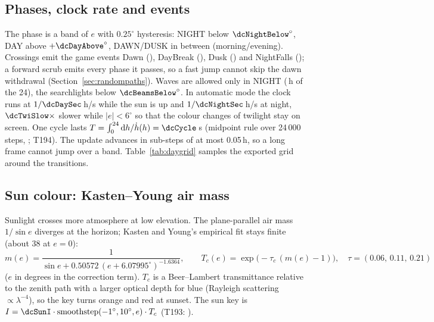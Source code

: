 \subsection{Phases, clock rate and events}
The phase is a band of $e$ with $0.25^\circ$ hysteresis: NIGHT below $\dcNightBelow^\circ$, DAY above $+\dcDayAbove^\circ$, DAWN/DUSK in between (morning/evening). Crossings emit the game events Dawn (\dcEvDawn), DayBreak (\dcEvDayBreak), Dusk (\dcEvDusk) and NightFalls (\dcEvNightFalls); a forward scrub emits every phase it passes, so a fast jump cannot skip the dawn withdrawal (Section~\ref{sec:randompaths}). Waves are allowed only in NIGHT (\dcWaveHours\,h of the 24), the searchlights below $\dcBeamsBelow^\circ$.
In automatic mode the clock runs at $1/\dcDaySec$\,h/s while the sun is up and $1/\dcNightSec$\,h/s at night, $\dcTwiSlow\times$ slower while $|e|<6^\circ$ so that the colour changes of twilight stay on screen. One cycle lasts $T=\int_0^{24}\mathrm d h/\dot h(h)=\dcCycle$\,s (midpoint rule over 24\,000 steps, ; T194). The update advances in sub-steps of at most 0.05\,h, so a long frame cannot jump over a band.
Table~\ref{tab:daygrid} samples the exported grid around the transitions.
\begin{table}[h]
\centering\scriptsize\setlength{\tabcolsep}{3pt}
\caption{Day-cycle grid (generated from ): elevation $e$, azimuth $A$, key light, its intensity and colour, exposure key $\log_2k$, daylight weight, practical-lamp scale, searchlights, waves and the mean cloud-shadow factor over the compound.}\label{tab:daygrid}
\tabDayGrid
\end{table}

\subsection{Sun colour: Kasten--Young air mass}
Sunlight crosses more atmosphere at low elevation. The plane-parallel air mass $1/\sin e$ diverges at the horizon; Kasten and Young's empirical fit stays finite (about 38 at $e=0$):
\begin{equation}
m(e)=\frac{1}{\sin e+0.50572\,(e+6.07995^\circ)^{-1.6364}},\qquad T_c(e)=\exp\bigl(-\tau_c\,(m(e)-1)\bigr),\quad \tau=(0.06,\,0.11,\,0.21)
\end{equation}
($e$ in degrees in the correction term). $T_c$ is a Beer--Lambert transmittance relative to the zenith path with a larger optical depth for blue (Rayleigh scattering $\propto\lambda^{-4}$), so the key turns orange and red at sunset. The sun key is $I=\dcSunI\cdot\mathrm{smoothstep}(-1^\circ,10^\circ,e)\cdot T_c$ (T193: ).
\lstAirMass


